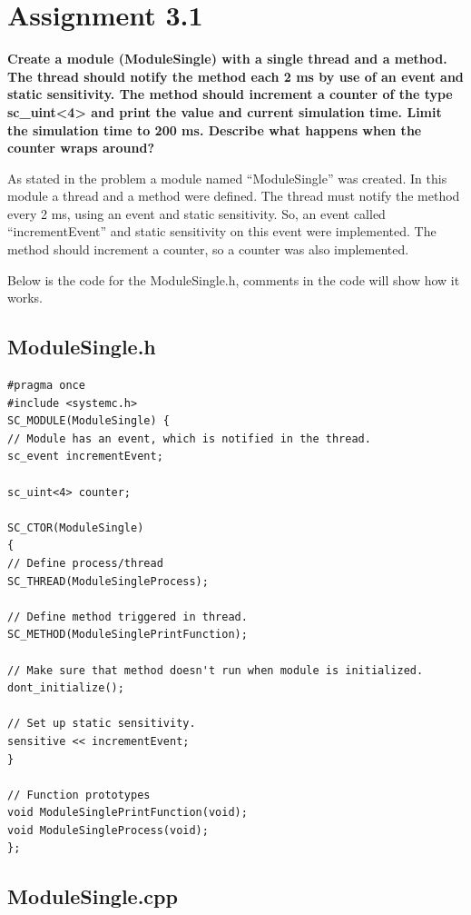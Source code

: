 
\chapter{Assignment 3.1}

\textbf{Create a module (ModuleSingle) with a single thread and a method. The thread should notify
	the method each 2 ms by use of an event and static sensitivity. The method should increment a
	counter of the type sc\_uint<4> and print the value and current simulation time. Limit the
	simulation time to 200 ms. Describe what happens when the counter wraps around?
}

As stated in the problem a module named “ModuleSingle” was created. In this module a thread and a method were defined. The thread must notify the method every 2 ms, using an event and static sensitivity. So, an event called “incrementEvent” and static sensitivity on this event were implemented. The method should increment a counter, so a counter was also implemented.

Below is the code for the ModuleSingle.h, comments in the code will show how it works. 

\section{ModuleSingle.h}
\begin{lstlisting}
#pragma once
#include <systemc.h>
SC_MODULE(ModuleSingle) {
// Module has an event, which is notified in the thread.
sc_event incrementEvent;

sc_uint<4> counter;

SC_CTOR(ModuleSingle)
{
// Define process/thread
SC_THREAD(ModuleSingleProcess);

// Define method triggered in thread.
SC_METHOD(ModuleSinglePrintFunction);

// Make sure that method doesn't run when module is initialized.
dont_initialize();

// Set up static sensitivity.
sensitive << incrementEvent;
}

// Function prototypes
void ModuleSinglePrintFunction(void);
void ModuleSingleProcess(void);
};

\end{lstlisting}






\section{ModuleSingle.cpp}

